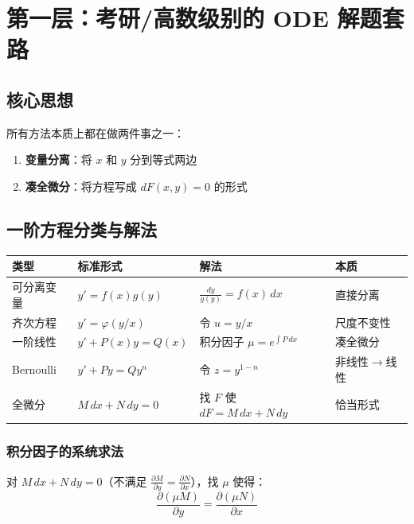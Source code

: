 \section{第一层：考研/高数级别的 ODE 解题套路}

\subsection{核心思想}

所有方法本质上都在做两件事之一：
\begin{enumerate}
  \item \textbf{变量分离}：将 $x$ 和 $y$ 分到等式两边
  \item \textbf{凑全微分}：将方程写成 $dF(x,y) = 0$ 的形式
\end{enumerate}

\subsection{一阶方程分类与解法}

\begin{center}
\begin{tabular}{L{2.5cm}L{4cm}L{4cm}L{3cm}}
\toprule
\textbf{类型} & \textbf{标准形式} & \textbf{解法} & \textbf{本质} \\
\midrule
可分离变量 & $y' = f(x)g(y)$ & $\frac{dy}{g(y)} = f(x)\,dx$ & 直接分离 \\
齐次方程 & $y' = \varphi(y/x)$ & 令 $u = y/x$ & 尺度不变性 \\
一阶线性 & $y' + P(x)y = Q(x)$ & 积分因子 $\mu = e^{\int P\,dx}$ & 凑全微分 \\
Bernoulli & $y' + Py = Qy^n$ & 令 $z = y^{1-n}$ & 非线性$\to$线性 \\
全微分 & $M\,dx + N\,dy = 0$ & 找 $F$ 使 $dF = M\,dx + N\,dy$ & 恰当形式 \\
\bottomrule
\end{tabular}
\end{center}

\subsubsection{积分因子的系统求法}

对 $M\,dx + N\,dy = 0$（不满足 $\frac{\partial M}{\partial y} = \frac{\partial N}{\partial x}$），找 $\mu$ 使得：
\[
\frac{\partial(\mu M)}{\partial y} = \frac{\partial(\mu N)}{\partial x}
\]

